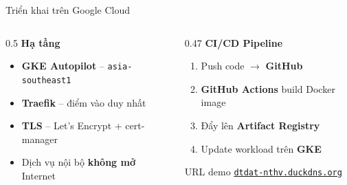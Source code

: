 \begin{frame}{Triển khai trên Google Cloud}

\begin{columns}[T]
\begin{column}{0.5\textwidth}
  \textbf{Hạ tầng}
  \begin{itemize}
    \item \textbf{GKE Autopilot} -- \texttt{asia-southeast1}
    \item \textbf{Traefik} -- điểm vào duy nhất
    \item \textbf{TLS} -- Let's Encrypt + cert-manager
    \item Dịch vụ nội bộ \textbf{không mở} Internet
  \end{itemize}

\end{column}
\begin{column}{0.47\textwidth}
  \textbf{CI/CD Pipeline}
  \begin{enumerate}\small
    \item Push code $\to$ \textbf{GitHub}
    \item \textbf{GitHub Actions} build Docker image
    \item Đẩy lên \textbf{Artifact Registry}
    \item Update workload trên \textbf{GKE}
  \end{enumerate}

  \vspace{0.4em}
  \begin{block}{URL demo}
    \centering\small
    \href{https://dtdat-nthv.duckdns.org}{\texttt{dtdat-nthv.duckdns.org}}
  \end{block}
\end{column}
\end{columns}

\end{frame}
